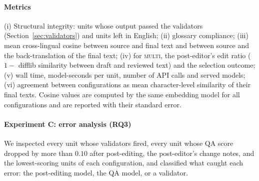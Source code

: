\paragraph{Metrics}
(i) Structural integrity: units whose output passed the validators (Section~\ref{sec:validators}) and units left in English; (ii) glossary compliance; (iii) mean cross-lingual cosine between source and final text and between source and the back-translation of the final text; (iv) for \textsc{multi}, the post-editor's edit ratio ($1-$ difflib similarity between draft and reviewed text) and the selection outcome; (v) wall time, model-seconds per unit, number of API calls and served models; (vi) agreement between configurations as mean character-level similarity of their final texts. Cosine values are computed by the same embedding model for all configurations and are reported with their standard error.

\paragraph{Experiment C: error analysis (RQ3)}
We inspected every unit whose validators fired, every unit whose QA score dropped by more than $0.10$ after post-editing, the post-editor's change notes, and the lowest-scoring units of each configuration, and classified what caught each error: the post-editing model, the QA model, or a validator.
